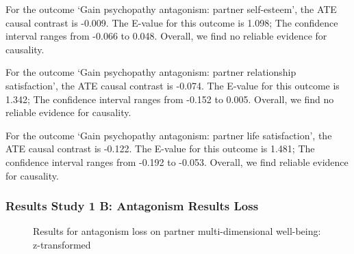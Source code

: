 \documentclass[
  singlecolumn]{article}
\begin{document}
For the outcome `Gain psychopathy antagonism: partner self-esteem', the
ATE causal contrast is -0.009. The E-value for this outcome is 1.098;
The confidence interval ranges from -0.066 to 0.048. Overall, we find no
reliable evidence for causality.

For the outcome `Gain psychopathy antagonism: partner relationship
satisfaction', the ATE causal contrast is -0.074. The E-value for this
outcome is 1.342; The confidence interval ranges from -0.152 to 0.005.
Overall, we find no reliable evidence for causality.

For the outcome `Gain psychopathy antagonism: partner life
satisfaction', the ATE causal contrast is -0.122. The E-value for this
outcome is 1.481; The confidence interval ranges from -0.192 to -0.053.
Overall, we find reliable evidence for causality.

\newpage{}

\subsubsection{Results Study 1 B: Antagonism Results
Loss}\label{results-study-1-b-antagonism-results-loss}

\begin{figure}


\caption{\label{fig-results-antagonism-loss}Results for antagonism loss
on partner multi-dimensional well-being: z-transformed}

\end{figure}%

\newpage{}
\end{document}
